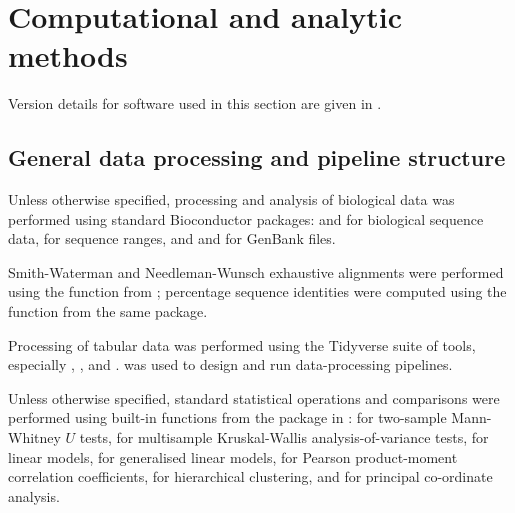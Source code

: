 \section{Computational and analytic methods}
\label{sec:methods_comp}

Version details for software used in this section are given in .

\subsection{General data processing and pipeline structure}
\label{sec:methods_comp_general}

Unless otherwise specified, processing and analysis of biological data was performed using standard Bioconductor \parencite{huber2015bioconductor} packages:  \parencite{pages2017biostrings} and  \parencite{pages2018bsgenome} for biological sequence data,  \parencite{lawrence2013genomicranges} for sequence ranges, and  \parencite{becker2018genbankr} and  \parencite{winter2017rentrez} for GenBank files. 

Smith-Waterman and Needleman-Wunsch exhaustive alignments \parencite{needleman1970alignment,waterman1981alignment} were performed using the  function from ; percentage sequence identities were computed using the  function from the same package.

Processing of tabular data was performed using the Tidyverse suite of tools, especially  \parencite{wickham2018readr},  \parencite{wickham2018dplyr},  \parencite{wickham2018tidyr} and  \parencite{wickham2018stringr}.  \parencite{koster2012snakemake} was used to design and run data-processing pipelines.

Unless otherwise specified, standard statistical operations and comparisons were performed using built-in functions from the  package in  \parencite{rcore2018rcore}:  for two-sample Mann-Whitney $U$ tests,  for multisample Kruskal-Wallis analysis-of-variance tests,  for linear models,  for generalised linear models,  for Pearson product-moment correlation coefficients,  for hierarchical clustering, and  for principal co-ordinate analysis.

